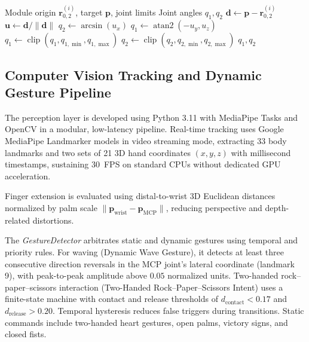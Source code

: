 \documentclass[lettersize,journal]{IEEEtran}
\begin{document}
	
	\begin{algorithm}[H]
		\caption{SOFIA Module Inverse Kinematics}
		\label{alg:sofia_ik}
		\footnotesize
		\begin{algorithmic}[1]
			\Require Module origin $\mathbf{r}_{0,2}^{(i)}$, target $\mathbf{p}$, joint limits
			\Ensure Joint angles $q_1,q_2$
			\State $\mathbf{d} \gets \mathbf{p}-\mathbf{r}_{0,2}^{(i)}$
			\State $\mathbf{u} \gets \mathbf{d}/\|\mathbf{d}\|$
			\State $q_2 \gets \arcsin(u_x)$
			\State $q_1 \gets \operatorname{atan2}(-u_y,u_z)$
			\State $q_1 \gets \operatorname{clip}(q_1,q_{1,\min},q_{1,\max})$
			\State $q_2 \gets \operatorname{clip}(q_2,q_{2,\min},q_{2,\max})$
			\State \Return $q_1,q_2$
		\end{algorithmic}
	\end{algorithm}
	
	
	\subsection{Computer Vision Tracking and Dynamic Gesture Pipeline}
	\label{sec:vision_pipeline}
	
	The perception layer is developed using Python 3.11 with MediaPipe Tasks and OpenCV in a modular, low-latency pipeline. Real-time tracking uses Google MediaPipe Landmarker models in video streaming mode, extracting 33 body landmarks and two sets of 21 3D hand coordinates $(x,y,z)$ with millisecond timestamps, sustaining 30~FPS on standard CPUs without dedicated GPU acceleration.
	
	Finger extension is evaluated using distal-to-wrist 3D Euclidean distances normalized by palm scale $\lVert \mathbf{p}_{\text{wrist}}-\mathbf{p}_{\text{MCP}}\rVert$, reducing perspective and depth-related distortions.
	
	The \textit{GestureDetector} arbitrates static and dynamic gestures using temporal and priority rules. For waving (Dynamic Wave Gesture), it detects at least three consecutive direction reversals in the MCP joint's lateral coordinate (landmark 9), with peak-to-peak amplitude above $0.05$ normalized units. Two-handed rock--paper--scissors interaction (Two-Handed Rock--Paper--Scissors Intent) uses a finite-state machine with contact and release thresholds of $d_{\text{contact}}<0.17$ and $d_{\text{release}}>0.20$. Temporal hysteresis reduces false triggers during transitions. Static commands include two-handed heart gestures, open palms, victory signs, and closed fists.
	
\end{document}
